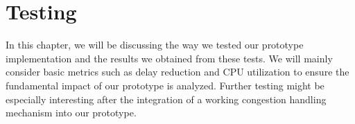 
\chapter{Testing}\label{chap:testing}

In this chapter, we will be discussing the way we tested our prototype
implementation and the results we obtained from these tests.
We will mainly consider basic metrics such as delay reduction and 
CPU utilization to ensure the fundamental impact of our prototype
is analyzed.
Further testing might be especially interesting after the integration
of a working congestion handling mechanism into our prototype.



